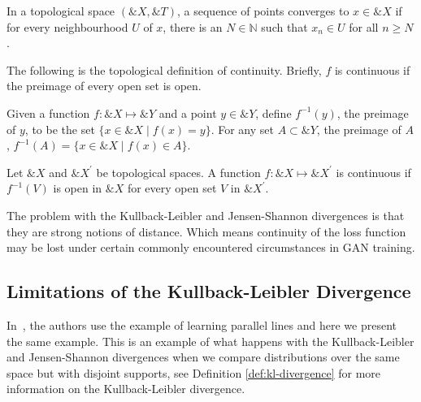 \begin{definition}%
  \label{def:convergence-topological-space}
  In a topological space $(\&X, \&T)$, a sequence of points
  \textnormal{\sffamily converges} to $x \in \&X$ if for every
  neighbourhood $U$ of $x$, there is an $N \in \mathbb{N}$ such that
  $x_n \in U$ for all $n \geq N$.
\end{definition}

The following is the topological definition of continuity. Briefly,
$f$ is continuous if the preimage of every open set is open.

\begin{definition}%
  \label{def:pre-image}
  Given a function $f: \&X \mapsto \&Y$ and a point $y \in \&Y$,
  define $f^{-1}(y)$, the \textnormal{\sffamily preimage} of $y$, to
  be the set $\{x \in \&X \mid f(x) = y\}$.  For any set
  $A \subset \&Y$, the preimage of $A$,
  $f^{-1}(A) = \{x \in \&X \mid f(x) \in A\}$.
\end{definition}

\begin{definition}%
  \label{def:continuity-topological-space}
  Let $\&X$ and $\&X^\prime$ be topological spaces. A function
  $f: \&X \mapsto \&X^\prime$ is \textnormal{\sffamily continuous} if
  $f^{-1}(V)$ is open in $\&X$ for every open set $V$ in $\&X^\prime$.
\end{definition}

The problem with the Kullback-Leibler and Jensen-Shannon divergences
is that they are strong notions of distance. Which means continuity of
the loss function may be lost under certain commonly encountered
circumstances in GAN training.

\subsection{Limitations of the Kullback-Leibler Divergence}

In~\cite{ref:arjovsky-2017}, the authors use the example of learning
parallel lines and here we present the same example. This is an
example of what happens with the Kullback-Leibler and Jensen-Shannon
divergences when we compare distributions over the same space but with
disjoint supports, see Definition \ref{def:kl-divergence} for more
information on the Kullback-Leibler divergence.

